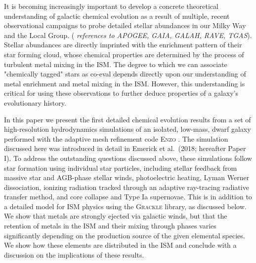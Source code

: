 \documentclass[twocolumn]{aastex61}
\begin{document}
It is becoming increasingly important to develop a concrete theoretical understanding of galactic chemical evolution as a result of multiple, recent observational campaigns to probe detailed stellar abundances in our Milky Way and the Local Group. (\textit{ references to APOGEE, GAIA, GALAH, RAVE, TGAS}). Stellar abundances are directly imprinted with the enrichment pattern of their star forming cloud, whose chemical properties are determined by the process of turbulent metal mixing in the ISM. The degree to which we can associate "chemically tagged" stars as co-eval depends directly upon our understanding of metal enrichment and metal mixing in the ISM. However, this understanding is critical for using these observations to further deduce properties of a galaxy's evolutionary history.

In this paper we present the first detailed chemical evolution results from a set of high-resolution hydrodynamics simulations of an isolated, low-mass, dwarf galaxy performed with the adaptive mesh refinement code \textsc{Enzo} \citep{Enzo2014}. The simulation discussed here was introduced in detail in
Emerick et al.\ (2018; hereafter Paper I). To address the outstanding questions discussed above, these simulations follow star formation using individual star particles, including stellar feedback from massive star and AGB-phase stellar winds, photoelectric heating, Lyman Werner dissociation, ionizing radiation tracked through an adaptive ray-tracing radiative transfer method, and core collapse and Type Ia supernovae. This is in addition to a detailed model for ISM physics using the \textsc{Grackle} library, as discussed below. We show that metals are strongly ejected via galactic winds, but that the retention of metals in the ISM and their mixing through phases varies significantly depending on the production source of the given elemental species. We show how these elements are distributed in the ISM and conclude with a discussion on the implications of these results.
\end{document}
